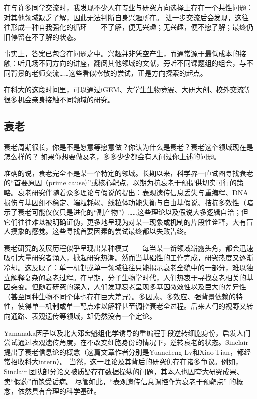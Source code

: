 在与许多同学交流时，我发现不少人在专业与研究方向选择上存在一个共性问题：对其他领域缺乏了解，因此无法判断自身兴趣所在。
进一步交流后会发现，这往往形成一种自我强化的循环——不了解，便无兴趣；无兴趣，便不愿了解；最终仍旧停留在不了解的状态。

事实上，答案已包含在问题之中。兴趣并非凭空产生，而通常源于最低成本的接触：听几场不同方向的讲座，翻阅其他领域的文献，旁听不同课题组的组会，与不同背景的老师交流……这些看似零散的尝试，正是方向探索的起点。

在科大的这段时间里，可以通过iGEM、大学生生物竞赛、大研大创、校外交流等很多机会亲身接触不同领域的研究。
\subsection*{衰老}

衰老周期很长，你是不是愿意等愿意做？你认为什么是衰老？衰老这个领域现在是怎么样的？
如果你想要做衰老，多多少少都会有人问过你上述的问题。

准确的说，衰老完全不是某一个特定的领域。长期以来，科学界一直试图寻找衰老的“首要原因（prime cause）”或核心靶点，以期为抗衰老干预提供切实可行的策略。衰老研究伴随着众多理论与假说的提出：表观遗传信息丢失与重编程、DNA损伤与基因组不稳定、端粒耗竭、线粒体功能失衡与自由基假说、拮抗多效性（暗示了衰老可能仅仅只是进化的“副产物”）……这些理论以及假说大多逻辑自洽；但它们往往难以被明确证伪，更多地呈现为对某一现象或机制的片段性诠释，大有盲人摸象的感觉。这些寻找首要因素的尝试最终都以失败告终。

衰老研究的发展历程似乎呈现出某种模式——每当某一新领域崭露头角，都会迅速吸引大量研究者涌入，掀起研究热潮。然而当基础性的工作完成，研究热度又逐渐冷却。这反映了：单一机制或单一领域往往只能揭示衰老全貌中的一部分，难以独立解释复杂的衰老过程。在早期，分子生物学时代，人们热衷于寻找衰老相关的基因突变。但随着研究的深入，人们发现衰老呈现多基因微效性以及巨大的差异性（甚至同种生物不同个体也存在巨大差异）。多因素、多效应、强背景依赖的特性，使得单一机制或单一靶点难以解释甚至调控衰老全过程。后来人们的视野又转向通路、表观遗传等领域，却仍然没有一个定论。

Yamanaka因子以及北大邓宏魁组化学诱导的重编程手段逆转细胞身份，启发人们尝试通过表观遗传角度，在不改变细胞身份的情况下，逆转衰老的状态。Sinclair提出了衰老信息论的概念（这篇文章作者分别是Yuancheng Lv和Xiao Tian，都经常招收科大intern）。
当然，这一理论及其背后的研究仍存在诸多争议。例如，Sinclair 团队部分论文被质疑存在数据操纵的问题，其本人也因夸大研究成果、卖“假药”而饱受诟病。
尽管如此，“表观遗传信息调控作为衰老干预靶点” 的概念，依然具有合理的科学基础。

